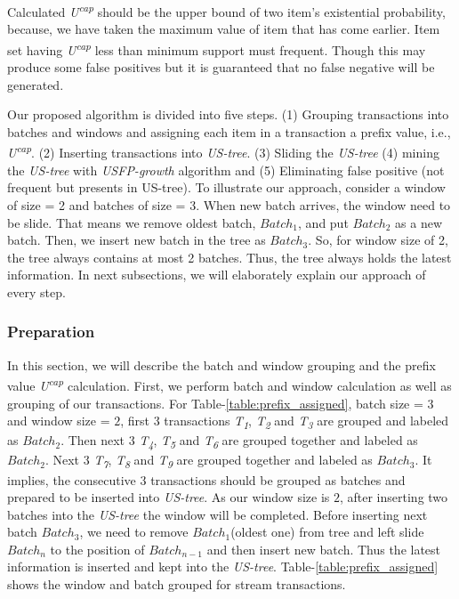 \documentclass[conference]{IEEEtran}
\begin{document}
Calculated \emph{U\textsuperscript{cap}} should be the upper bound of two item's existential probability, because, we have taken the maximum value of item that has come earlier. Item set having \emph{U\textsuperscript{cap}} less than minimum support must frequent. Though this may produce some false positives but it is guaranteed that no false negative will be generated.
      
Our proposed algorithm is divided into five steps. (1) Grouping transactions into batches and windows and assigning each item in a transaction a prefix value, i.e., \emph{U\textsuperscript{cap}}. (2) Inserting transactions into \emph {US-tree}. (3) Sliding the \emph {US-tree} (4) mining the \emph {US-tree} with \emph{USFP-growth} algorithm and (5) Eliminating false positive (not frequent but presents in US-tree). To illustrate our approach, consider a window of size = 2 and batches of size = 3. When new batch arrives, the window need to be slide. That means we remove oldest batch, $Batch_1$, and put $Batch_2$ as a new batch. Then, we insert new batch in the tree as $Batch_3$. So, for window size of 2, the tree always contains at most 2 batches. Thus, the tree always holds the latest information. In next subsections, we will elaborately explain our approach of every step.

\subsubsection{Preparation}

%

In this section, we will describe the batch and window grouping and the prefix value \emph{U\textsuperscript{cap}} calculation. First, we perform batch and window calculation as well as grouping of our transactions. For Table-\ref{table:prefix_assigned}, batch size = \emph{$3$} and window size = \emph{$2$}, first \emph{$3$} transactions \emph{T\textsubscript{1}}, \emph{T\textsubscript{2}} and \emph{T\textsubscript{3}} are grouped and labeled as $Batch_{2}$. Then next \emph{$3$} \emph{T\textsubscript{4}}, \emph{T\textsubscript{5}} and \emph{T\textsubscript{6}} are grouped together and labeled as $Batch_{2}$. Next \emph{$3$} \emph{T\textsubscript{7}}, \emph{T\textsubscript{8}} and \emph{T\textsubscript{9}} are grouped together and labeled as $Batch_{3}$. It implies, the consecutive  \emph{$3$} transactions should be grouped as batches and prepared to be inserted into \emph{US-tree}. As our window size is $2$, after inserting two batches into the \emph{US-tree} the window will be completed. Before inserting next batch $Batch_{3}$, we need to remove $Batch_{1}$(oldest one) from tree and left slide $Batch_{n}$ to the position of $Batch_{n-1}$ and then insert new batch. Thus the latest information is inserted and kept into the \emph{US-tree}. Table-\ref{table:prefix_assigned} shows the window and batch grouped for stream transactions.
\end{document}
